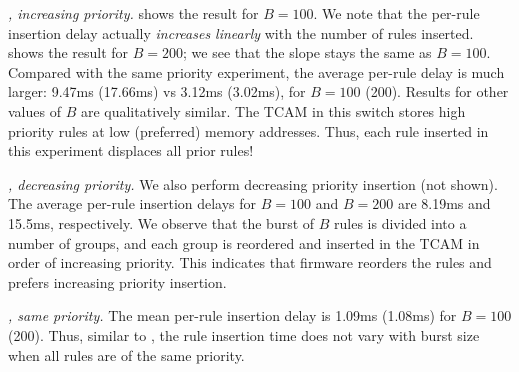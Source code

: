 \emph{\BroadcomOne, increasing priority.}
 shows the result for
$B=100$. We note that the per-rule insertion delay actually {\em
  increases linearly} with the number of
rules inserted. 
shows the result for $B=200$; we see that the slope stays the same as
$B=100$. Compared with the same priority experiment, the average per-rule
delay is much larger: 9.47ms (17.66ms) vs 3.12ms (3.02ms), for $B=100$ (200). 
Results for other values of $B$ are qualitatively similar. 
The TCAM in this switch stores high priority rules at low (preferred)
memory addresses. Thus, each rule inserted in this experiment
displaces all prior rules!

\emph{\BroadcomOne, decreasing priority.} 
We also perform decreasing priority insertion (not shown). The average 
per-rule insertion delays for $B=100$ and $B=200$ are 8.19ms and 15.5ms, respectively. We observe that the burst of $B$ rules is divided into a number 
of groups, and each group is reordered and inserted in the TCAM in order of increasing priority. 
This indicates that \BroadcomOne firmware reorders the rules and prefers
increasing priority insertion. 

\emph{\BroadcomThree, same priority.} 
The mean per-rule insertion
delay is 1.09ms (1.08ms) for $B=100$ (200). Thus, similar to \BroadcomOne,
the rule insertion time does not vary with burst size when all rules are of
the same priority. 

